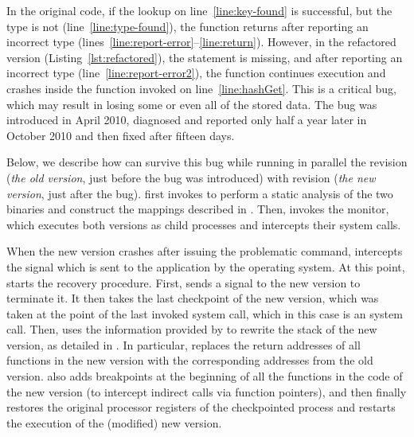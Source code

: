 In the original code, if the lookup on line~\ref{line:key-found} is
successful, but the type is not 
(line~\ref{line:type-found}), the function returns after reporting an
incorrect type
(lines~\ref{line:report-error}--\ref{line:return}). However, in the
refactored version (Listing~\ref{lst:refactored}), the
 statement is missing, and after reporting an
incorrect type (line~\ref{line:report-error2}), the function continues
execution and crashes inside the  function invoked on
line~\ref{line:hashGet}.
This is a critical bug, which may result in losing some or even all
of the stored data.
The bug was introduced in April 2010, diagnosed and reported only
half a year later in October 2010 and then fixed after fifteen days.



Below, we describe how \mx can survive this bug while running in
parallel the \redis revision  (\textit{the old
  version}, just before the bug was introduced) with revision
 (\textit{the new version}, just after the bug).
\mx first invokes \sea to perform a static analysis of the two
binaries and construct the mappings described in
.  Then, \mx invokes the \mxm monitor, which
executes both versions as child processes and intercepts their system
calls.

When the new version crashes after issuing the problematic
 command, \mxm intercepts the  signal
which is sent to the application by the operating system.  At
this point, \rem starts the recovery procedure.  First, \rem sends a
 signal to the new version to terminate it.  It then
takes the last checkpoint of the new version, which was taken at the
point of the last invoked system call, which in this case is an
 system call.  Then, \rem uses the information
provided by \sea to rewrite the stack of the new version, as detailed
in .  In particular, \rem replaces the return
addresses of all functions in the new version with the corresponding
addresses from the old version.  \rem also adds breakpoints at the
beginning of all the functions in the code of the new version (to
intercept indirect calls via function pointers), and then finally
restores the original processor registers of the checkpointed process
and restarts the execution of the (modified) new version.

